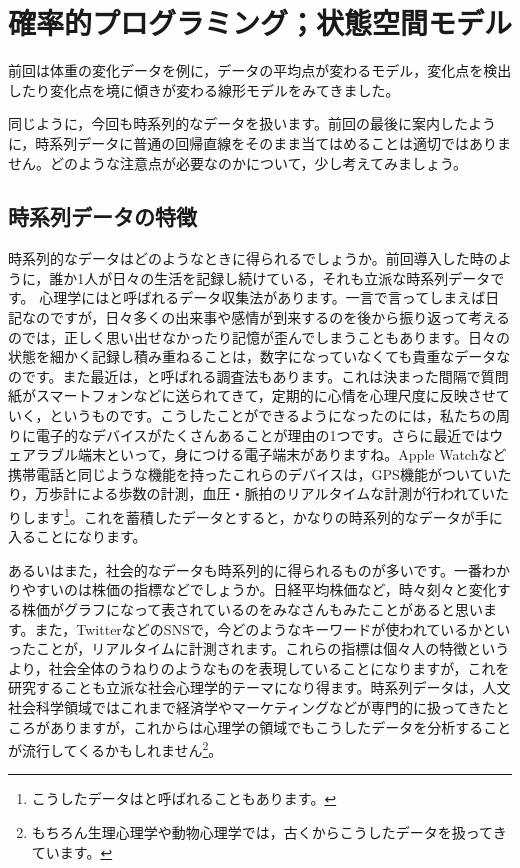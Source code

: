 \documentclass{ltjsbook}
\begin{document}
\chapter{確率的プログラミング；状態空間モデル}
\label{x29_SSpace}
前回は体重の変化データを例に，データの平均点が変わるモデル，変化点を検出したり変化点を境に傾きが変わる線形モデルをみてきました。

同じように，今回も時系列的なデータを扱います。前回の最後に案内したように，時系列データに普通の回帰直線をそのまま当てはめることは適切ではありません。どのような注意点が必要なのかについて，少し考えてみましょう。

\section{時系列データの特徴}
時系列的なデータはどのようなときに得られるでしょうか。前回導入した時のように，誰か1人が日々の生活を記録し続けている，それも立派な時系列データです。
心理学にはと呼ばれるデータ収集法があります。一言で言ってしまえば日記なのですが，日々多くの出来事や感情が到来するのを後から振り返って考えるのでは，正しく思い出せなかったり記憶が歪んでしまうこともあります。日々の状態を細かく記録し積み重ねることは，数字になっていなくても貴重なデータなのです。また最近は，と呼ばれる調査法もあります。これは決まった間隔で質問紙がスマートフォンなどに送られてきて，定期的に心情を心理尺度に反映させていく，というものです。こうしたことができるようになったのには，私たちの周りに電子的なデバイスがたくさんあることが理由の1つです。さらに最近ではウェアラブル端末といって，身につける電子端末がありますね。Apple Watchなど携帯電話と同じような機能を持ったこれらのデバイスは，GPS機能がついていたり，万歩計による歩数の計測，血圧・脈拍のリアルタイムな計測が行われていたりします\footnote{こうしたデータはと呼ばれることもあります。}。これを蓄積したデータとすると，かなりの時系列的なデータが手に入ることになります。

あるいはまた，社会的なデータも時系列的に得られるものが多いです。一番わかりやすいのは株価の指標などでしょうか。日経平均株価など，時々刻々と変化する株価がグラフになって表されているのをみなさんもみたことがあると思います。また，TwitterなどのSNSで，今どのようなキーワードが使われているかといったことが，リアルタイムに計測されます。これらの指標は個々人の特徴というより，社会全体のうねりのようなものを表現していることになりますが，これを研究することも立派な社会心理学的テーマになり得ます。時系列データは，人文社会科学領域ではこれまで経済学やマーケティングなどが専門的に扱ってきたところがありますが，これからは心理学の領域でもこうしたデータを分析することが流行してくるかもしれません\footnote{もちろん生理心理学や動物心理学では，古くからこうしたデータを扱ってきています。}。
\end{document}
